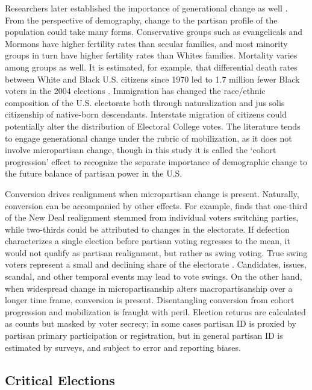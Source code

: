 Researchers later established the importance of generational change as well \citep{miller_generational_1992, black_rise_2009, carmines_issue_1981}. From the perspective of demography, change to the partisan profile of the population could take many forms. Conservative groups such as evangelicals and Mormons have higher fertility rates than secular families, and most minority groups in turn have higher fertility rates than Whites families. Mortality varies among groups as well. It is estimated, for example, that differential death rates between White and Black U.S. citizens since 1970 led to 1.7 million fewer Black voters in the 2004 elections \citep{rodriguez_black_2015}. Immigration has changed the race/ethnic composition of the U.S. electorate both through naturalization and jus solis citizenship of native-born descendants. Interstate migration of citizens could potentially alter the distribution of Electoral College votes. The literature tends to engage generational change under the rubric of mobilization, as it does not involve micropartisan change, though in this study it is called the `cohort progression' effect to recognize the separate importance of demographic change to the future balance of partisan power in the U.S.     

Conversion drives realignment when micropartisan change is present. Naturally, conversion can be accompanied by other effects. For example, \citet{campbell_sources_1985} finds that one-third of the New Deal realignment stemmed from individual voters switching parties, while two-thirds could be attributed to changes in the electorate. If defection characterizes a single election before partisan voting regresses to the mean, it would not qualify as partisan realignment, but rather as swing voting. True swing voters represent a small and declining share of the electorate \citep{smidt_polarization_2017}. Candidates, issues, scandal, and other temporal events may lead to vote swings. On the other hand, when widespread change in micropartisanship alters macropartisanship over a longer time frame, conversion is present. Disentangling conversion from cohort progression and mobilization is fraught with peril. Election returns are calculated as counts but masked by voter secrecy; in some cases partisan ID is proxied by partisan primary participation or registration, but in general partisan ID is estimated by surveys, and subject to error and reporting biases.  

\subsection{Critical Elections}

